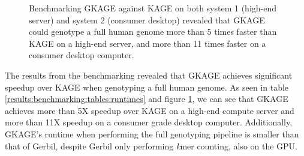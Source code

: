 %
\begin{figure}[H]
\hspace*{2.75cm}
\caption{
  Benchmarking GKAGE against KAGE on both system 1 (high-end server) and system 2 (consumer desktop) revealed that GKAGE could genotype a full human genome more than 5 times faster than KAGE on a high-end server, and more than 11 times faster on a consumer desktop computer.
}
\label{results:benchmarking:figures:runtimes}
\end{figure}
%

The results from the benchmarking revealed that GKAGE achieves significant speedup over KAGE when genotyping a full human genome.
As seen in table \ref{results:benchmarking:tables:runtimes} and figure \ref{results:benchmarking:figures:runtimes}, we can see that GKAGE achieves more than 5X speedup over KAGE on a high-end compute server and more than 11X speedup on a consumer grade desktop computer.
Additionally, GKAGE's runtime when performing the full genotyping pipeline is smaller than that of Gerbil, despite Gerbil only performing \textit{k}mer counting, also on the GPU.
